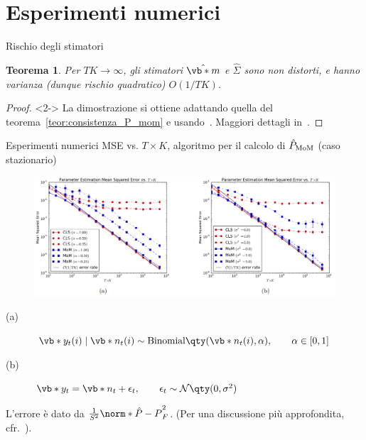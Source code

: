 \documentclass[10pt,xcolor={table,dvipsnames}]{beamer} 		%
\theoremstyle{plain}					%
\newtheorem{teorema}{Teorema}%
\theoremstyle{definition}
\theoremstyle{remark}
\begin{document}
	\section{Esperimenti numerici}
    \begin{frame}{Rischio degli stimatori}
        \begin{teorema}
            Per $TK\to\infty$, gli stimatori $\hat{\vb*{m}}$ e $\hat{\Sigma}$ sono non distorti, e hanno varianza (dunque rischio quadratico) $O(1/TK)$. 
        \end{teorema}
        \begin{proof}<2->
            La dimostrazione si ottiene adattando quella del teorema~\ref{teor:consistenza_P_mom} e usando~\cite[12-12 (p.~528)]{book:Papoulis}. Maggiori dettagli in~\cite{article:main}.
        \end{proof}
        \medskip

        
    \end{frame}

    \begin{frame}
        {Esperimenti numerici}
        {MSE vs. \texorpdfstring{$T\times K$}{TxK}, algoritmo per il calcolo di $\hat{P}_{\textup{MoM}}$ {\smaller (caso stazionario)}}
        \begin{figure}[ht]
			\centering
			\includegraphics[width=\textwidth]{Immagini/mom_cls_results_authors.png}
		\end{figure}
        \begin{description}
            \item[(a)] $\vb*{y}_t(i)\mid\vb*{n}_t(i)\sim\mathrm{Binomial}\qty(\vb*{n}_t(i),\alpha),\qquad\alpha\in[0,1]$
            \item[(b)] $\vb*{y}_t=\vb*{n}_t+\epsilon_t,\qquad\epsilon_t\sim\mathcal{N}\qty(0,\sigma^2)$
        \end{description}

        L'errore è dato da $\frac{1}{S^2}\norm*{\hat{P}-P}_F^2$.         
        {\smaller (Per una discussione più approfondita, cfr.~\cite{article:main})}.
    \end{frame}
\end{document}
